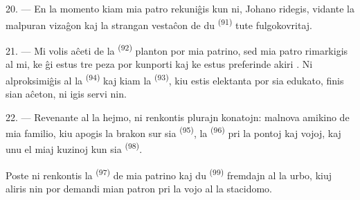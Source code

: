 \VUsaut{3.0mm}

20. --- En la momento kiam mia patro rekuniĝis kun ni, Johano ridegis, vidante
la malpuran vizaĝon kaj la strangan vestaĉon de du 
\textsuperscript{(91)} tute fulgokovritaj.

21. --- Mi volis aĉeti de la  \textsuperscript{(92)} planton
por mia patrino, sed mia patro rimarkigis al mi, ke ĝi estus tre peza por
kunporti kaj ke estus preferinde akiri . Ni alproksimiĝis al
la  \textsuperscript{(94)} kaj kiam la 
\textsuperscript{(93)}, kiu estis elektanta por sia edukato, finis sian aĉeton,
ni igis servi nin.

22. --- Revenante al la hejmo, ni renkontis plurajn konatojn: malnova amikino
de mia familio, kiu apogis la brakon sur sia 
\textsuperscript{(95)}, la  \textsuperscript{(96)} pri la
pontoj kaj vojoj, kaj unu el miaj kuzinoj kun sia 
\textsuperscript{(98)}.

Poste ni renkontis la  \textsuperscript{(97)} de mia
patrino kaj du  \textsuperscript{(99)} fremdajn al la urbo,
kiuj aliris nin por demandi mian patron pri la vojo al la stacidomo.
\VUsaut{6.0mm}
\VUfilet{22mm}
